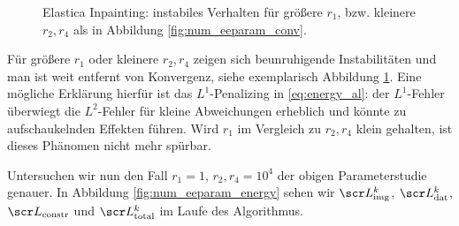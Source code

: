 \documentclass{mythesis}
\begin{document}
\begin{figure}[ht]
    \centering
    \caption{Elastica Inpainting: instabiles Verhalten für größere $r_1$, bzw. kleinere $r_2, r_4$ als in Abbildung \ref{fig:num_eeparam_conv}.}
    \label{fig:num_eeparam_instab}
\end{figure}

Für größere $r_1$ oder kleinere $r_2, r_4$ zeigen sich beunruhigende Instabilitäten und man ist weit entfernt von Konvergenz, siehe exemplarisch Abbildung \ref{fig:num_eeparam_instab}.
Eine mögliche Erklärung hierfür ist das $L^1$-Penalizing in \eqref{eq:energy_al}: der $L^1$-Fehler überwiegt die $L^2$-Fehler für kleine Abweichungen erheblich und könnte zu aufschaukelnden Effekten führen.
Wird $r_1$ im Vergleich zu $r_2, r_4$ klein gehalten, ist dieses Phänomen nicht mehr spürbar.

Untersuchen wir nun den Fall $r_1 = 1$, $r_2, r_4 = 10^4$ der obigen Parameterstudie genauer.
In Abbildung \ref{fig:num_eeparam_energy} sehen wir $\scr L_{\mathrm{img}}^k$, $\scr L_{\mathrm{dat}}^k$, $\scr L_{\mathrm{constr}}$ und $\scr L_{\mathrm{total}}^k$ im Laufe des Algorithmus.
\end{document}
